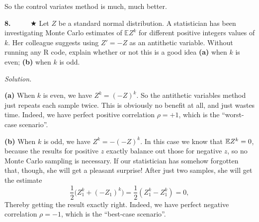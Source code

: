 \documentclass[
  letterpaper,
  DIV=11,
  numbers=noendperiod]{scrreprt}
\theoremstyle{plain}
\theoremstyle{definition}
\theoremstyle{definition}
\theoremstyle{remark}
\begin{document}
So the control variates method is much, much better.

\textbf{8.} ~~~~~★ Let \(Z\) be a standard normal distribution. A
statistician has been investigating Monte Carlo estimates of
\(\mathbb EZ^k\) for different positive integers values of \(k\). Her
colleague suggests using \(Z' = -Z\) as an antithetic variable. Without
running any R code, explain whether or not this is a good idea
\textbf{(a)} when \(k\) is even; \textbf{(b)} when \(k\) is odd.

\emph{Solution.}

\textbf{(a)} When \(k\) is even, we have \(Z^k = (-Z)^k\). So the
antithetic variables method just repeats each sample twice. This is
obviously no benefit at all, and just wastes time. Indeed, we have
perfect positive correlation \(\rho = +1\), which is the ``worst-case
scenario''.

\textbf{(b)} When \(k\) is odd, we have \(Z^k = -(-Z)^k\). In this case
we know that \(\mathbb{E} Z^k = 0\), because the results for positive \(z\)
exactly balance out those for negative \(z\), so no Monte Carlo sampling
is necessary. If our statistician has somehow forgotten that, though,
she will get a pleasant surprise! After just two samples, she will get
the estimate
\[\frac{1}{2} \big(Z_1^k + (-Z_1)^k \big) = \frac{1}{2} (Z_1^k - Z_1^k) = 0 ,\]
Thereby getting the result exactly right. Indeed, we have perfect
negative correlation \(\rho = -1\), which is the ``best-case scenario''.
\end{document}
